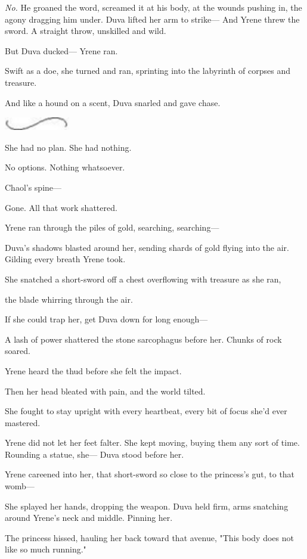 \emph{No.} He groaned the word, screamed it at his body, at the wounds pushing in, the agony dragging him under. Duva lifted her arm to strike--- And Yrene threw the sword. A straight throw, unskilled and wild.

But Duva ducked--- Yrene ran.

Swift as a doe, she turned and ran, sprinting into the labyrinth of corpses and treasure.

And like a hound on a scent, Duva snarled and gave chase.

\includegraphics[width=1.12in,height=0.24in]{images/seperator}

She had no plan. She had nothing.

No options. Nothing whatsoever.

Chaol's spine---

Gone. All that work  shattered.

Yrene ran through the piles of gold, searching, searching---

Duva's shadows blasted around her, sending shards of gold flying into the air. Gilding every breath Yrene took.

She snatched a short-sword off a chest overflowing with treasure as she ran,

the blade whirring through the air.

If she could trap her, get Duva down for long enough---

A lash of power shattered the stone sarcophagus before her. Chunks of rock soared.

Yrene heard the thud before she felt the impact.

Then her head bleated with pain, and the world tilted.

She fought to stay upright with every heartbeat, every bit of focus she'd ever mastered.

Yrene did not let her feet falter. She kept moving, buying them any sort of time. Rounding a statue, she--- Duva stood before her.

Yrene careened into her, that short-sword so close to the princess's gut, to that womb---

She splayed her hands, dropping the weapon. Duva held firm, arms snatching around Yrene's neck and middle. Pinning her.

The princess hissed, hauling her back toward that avenue, "This body does not like so much running."

